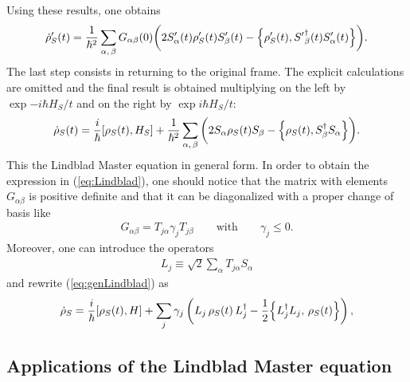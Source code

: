 Using these results, one obtains 
\begin{align*}
    \dot{\rho}'_{S}(t) = \frac{1}{\hbar^2} \sum_{\alpha,\, \beta} G_{\alpha \beta} (0) \bigg( 2 S'_\alpha(t) \rho'_S(t) S'_\beta(t) - \Bigl\{\rho'_S(t), {S'}_\beta^\dagger(t) S'_\alpha(t) \Bigr\} \bigg).
\end{align*}
The last step consists in returning to the original frame. The explicit calculations are omitted and the final result is obtained multiplying on the left by $\exp{-i \hbar H_S/t}$ and on the right by $\exp{i \hbar H_S/t}$: 
\begin{equation}
    \dot{\rho}_{S}(t) = \frac{i}{\hbar} [\rho_S(t),H_S] + \frac{1}{\hbar^2} \sum_{\alpha, \, \beta} \bigg( 2 S_\alpha \rho_S(t) S_\beta - \Bigl\{\rho_S(t), S_\beta^\dagger S_\alpha \Bigr\} \bigg). 
    \label{eq:genLindblad}
\end{equation}
This the Lindblad Master equation in general form. In order to obtain the expression in (\ref{eq:Lindblad}), one should notice that the matrix with elements $G_{\alpha \beta}$ is positive definite and that it can be diagonalized with a proper change of basis like
\begin{align*}
    G_{\alpha \beta} = T_{j \alpha } \gamma_j T_{j \beta } \qquad \text{with} \qquad \gamma_j \leq 0. 
\end{align*}
Moreover, one can introduce the operators 
\begin{align*}
    L_j \equiv \sqrt{2} \sum_{\alpha} T_{j \alpha} S_\alpha 
\end{align*}
and rewrite (\ref{eq:genLindblad}) as
\begin{align*}
    \dot{\rho}_S = \frac{i}{\hbar} [\rho_S(t),H] + \sum_j \gamma_j \left( L_j \, \rho_S(t) \,  L_j^\dagger - \frac{1}{2} \Bigl\{ L_j^\dagger L_j, \, \rho_S(t) \Bigr\} \right),
\end{align*}


\subsection{Applications of the Lindblad Master equation}

